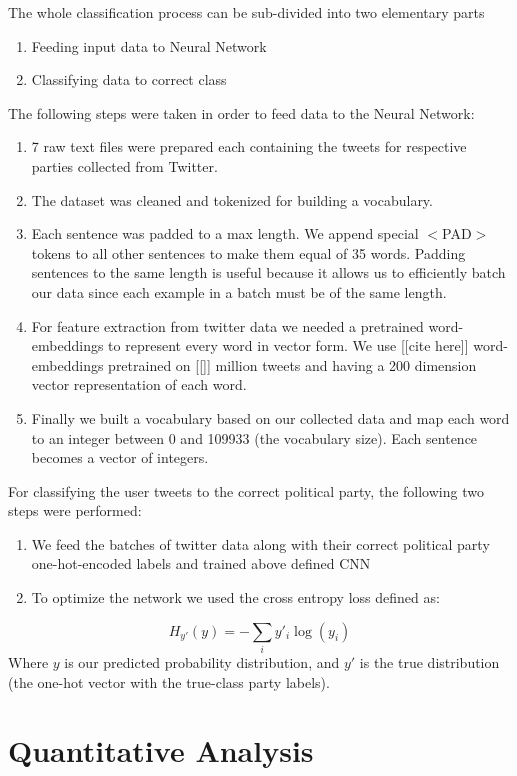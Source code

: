 \documentclass[10pt, oneside]{article}
\begin{document}
\begin{multicols}{2}
The whole classification process can be sub-divided into two elementary parts
\begin{enumerate}
\item Feeding input data to Neural Network
\item Classifying data to correct class
\end{enumerate}
The following steps were taken in order to feed data to the Neural Network:
\begin{enumerate}
\item 7 raw text files were prepared each containing the tweets for respective parties collected from Twitter.
\item The dataset was cleaned and tokenized for building a vocabulary.
\item Each sentence was padded to a max length. We append special $<$PAD$>$ tokens to all other sentences to make them equal of 35 words. Padding sentences to the same length is useful because it allows us to efficiently batch our data since each example in a batch must be of the same length.
\item For feature extraction from twitter data we needed a pretrained word-embeddings to represent every word in vector form. We use [[cite here]] word-embeddings pretrained on [[]] million tweets and having a 200 dimension vector representation of each word.  
\item Finally we built a vocabulary based on our collected data and map each word to an integer between 0 and 109933 (the vocabulary size). Each sentence becomes a vector of integers.
\end{enumerate}

For classifying the user tweets to the correct political party, the following two steps were performed:
\begin{enumerate}
	\item We feed the batches of twitter data along with their correct political party one-hot-encoded labels and trained above defined CNN 
	\item To optimize the network we used the cross entropy loss defined as:
\end{enumerate}
\begin{equation}
	H_{y'}(y) = - \sum_{i} y'_{i} \log (y_{i})
\end{equation}
Where $y$ is our predicted probability distribution, and $y'$ is the true distribution (the one-hot vector with the true-class party labels). 


\section{Quantitative Analysis}


\end{multicols}
\end{document}
